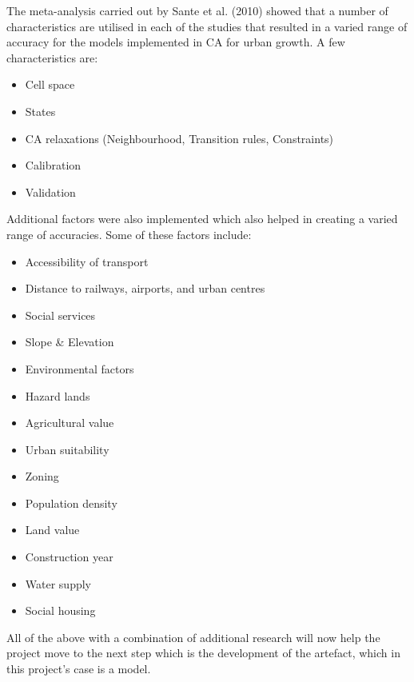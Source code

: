The meta-analysis carried out by Sante et al. (2010) showed that a number of characteristics are utilised in each of the studies that resulted in a varied range of accuracy for the models implemented in CA for urban growth.\citep{ca1}
A few characteristics are:
\begin{itemize}
\item Cell space
\item States
\item CA relaxations (Neighbourhood, Transition rules, Constraints)
\item Calibration
\item Validation
\end{itemize}
Additional factors were also implemented which also helped in creating a
varied range of accuracies. Some of these factors include:
\begin{itemize}
\item Accessibility of transport
\item Distance to railways, airports, and urban centres
\item Social services
\item Slope \& Elevation
\item Environmental factors
\item Hazard lands
\item Agricultural value
\item Urban suitability
\item Zoning
\item Population density
\item Land value
\item Construction year
\item Water supply
\item Social housing
\end{itemize}
All of the above with a combination of additional research will now help the
project move to the next step which is the development of the artefact, which
in this project's case is a model.